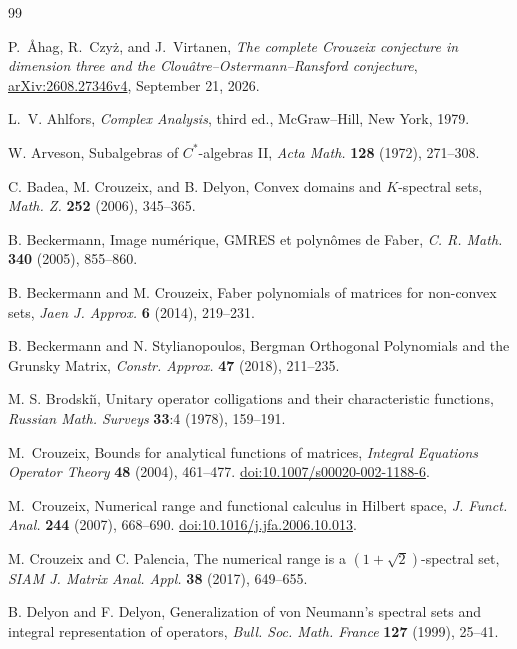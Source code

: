 \begin{thebibliography}{99}
\raggedright

P.~\AA hag, R.~Czy{\.{z}}, and J.~Virtanen,
\emph{The complete Crouzeix conjecture in dimension three and the
Clou\^atre--Ostermann--Ransford conjecture},
\href{https://arxiv.org/abs/2608.27346v4}{arXiv:2608.27346v4}, September 21, 2026.

L.~V. Ahlfors, \emph{Complex Analysis}, third ed., McGraw--Hill, New York, 1979.

W. Arveson, Subalgebras of $C^*$-algebras II,
\emph{Acta Math.} \textbf{128} (1972), 271--308.

C. Badea, M. Crouzeix, and B. Delyon, Convex domains and $K$-spectral sets,
\emph{Math. Z.} \textbf{252} (2006), 345--365.

B. Beckermann, Image num\'erique, GMRES et polyn\^omes de Faber,
\emph{C. R. Math.} \textbf{340} (2005), 855--860.

B. Beckermann and M. Crouzeix, Faber polynomials of matrices for non-convex sets,
\emph{Jaen J. Approx.} \textbf{6} (2014), 219--231.

B. Beckermann and N. Stylianopoulos, Bergman Orthogonal Polynomials and the
Grunsky Matrix, \emph{Constr. Approx.} \textbf{47} (2018), 211--235.

M. S. Brodski\u\i, Unitary operator colligations and their characteristic
functions, \emph{Russian Math. Surveys} \textbf{33}:4 (1978), 159--191.

M.~Crouzeix, Bounds for analytical functions of matrices,
\emph{Integral Equations Operator Theory} \textbf{48} (2004), 461--477.
\href{https://doi.org/10.1007/s00020-002-1188-6}{doi:10.1007/s00020-002-1188-6}.

M.~Crouzeix, Numerical range and functional calculus in Hilbert space,
\emph{J. Funct. Anal.} \textbf{244} (2007), 668--690.
\href{https://doi.org/10.1016/j.jfa.2006.10.013}{doi:10.1016/j.jfa.2006.10.013}.

M. Crouzeix and C. Palencia, The numerical range is a
$(1+\sqrt2)$-spectral set,
\emph{SIAM J. Matrix Anal. Appl.} \textbf{38} (2017), 649--655.

B. Delyon and F. Delyon, Generalization of von Neumann's spectral sets
and integral representation of operators,
\emph{Bull. Soc. Math. France} \textbf{127} (1999), 25--41.


\end{thebibliography}
